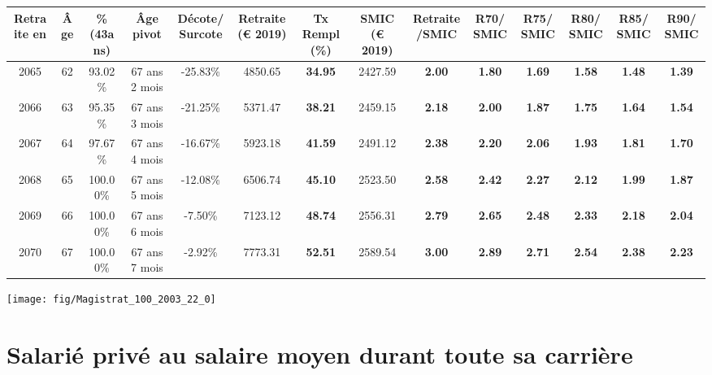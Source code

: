 \begin{adjustbox}{max width=\textwidth} 
\begin{tabular}[htb]{|c|c||c|c|c||c|c||c|c||c|c|c|c|c|} 
\hline 
 Retraite en &  Âge &  \%(43ans) &  Âge pivot &  Décote/Surcote &  Retraite (\euro{} 2019) &  Tx Rempl(\%) &  SMIC (\euro{} 2019) &  Retraite/SMIC &  R70/SMIC &  R75/SMIC &  R80/SMIC &  R85/SMIC &  R90/SMIC \\ 
\hline \hline 
 2065 &  62 &  93.02\% &  67 ans 2 mois &  -25.83\% &  4850.65 &  {\bf 34.95} &  2427.59 &  {\bf 2.00} &  {\bf 1.80} &  {\bf 1.69} &  {\bf 1.58} &  {\bf 1.48} &  {\bf 1.39} \\ 
\hline 
 2066 &  63 &  95.35\% &  67 ans 3 mois &  -21.25\% &  5371.47 &  {\bf 38.21} &  2459.15 &  {\bf 2.18} &  {\bf 2.00} &  {\bf 1.87} &  {\bf 1.75} &  {\bf 1.64} &  {\bf 1.54} \\ 
\hline 
 2067 &  64 &  97.67\% &  67 ans 4 mois &  -16.67\% &  5923.18 &  {\bf 41.59} &  2491.12 &  {\bf 2.38} &  {\bf 2.20} &  {\bf 2.06} &  {\bf 1.93} &  {\bf 1.81} &  {\bf 1.70} \\ 
\hline 
 2068 &  65 &  100.00\% &  67 ans 5 mois &  -12.08\% &  6506.74 &  {\bf 45.10} &  2523.50 &  {\bf 2.58} &  {\bf 2.42} &  {\bf 2.27} &  {\bf 2.12} &  {\bf 1.99} &  {\bf 1.87} \\ 
\hline 
 2069 &  66 &  100.00\% &  67 ans 6 mois &  -7.50\% &  7123.12 &  {\bf 48.74} &  2556.31 &  {\bf 2.79} &  {\bf 2.65} &  {\bf 2.48} &  {\bf 2.33} &  {\bf 2.18} &  {\bf 2.04} \\ 
\hline 
 2070 &  67 &  100.00\% &  67 ans 7 mois &  -2.92\% &  7773.31 &  {\bf 52.51} &  2589.54 &  {\bf 3.00} &  {\bf 2.89} &  {\bf 2.71} &  {\bf 2.54} &  {\bf 2.38} &  {\bf 2.23} \\ 
\hline 
\hline 
\end{tabular} 
\end{adjustbox} 
 
 \vspace{0.1cm} 

 {\hspace{-2.2cm}\texttt{[image: fig/Magistrat\_100\_2003\_22\_0]}} 

\newpage 
 
\chapter{Salarié privé au salaire moyen durant toute sa carrière} 

~\\ 
 
